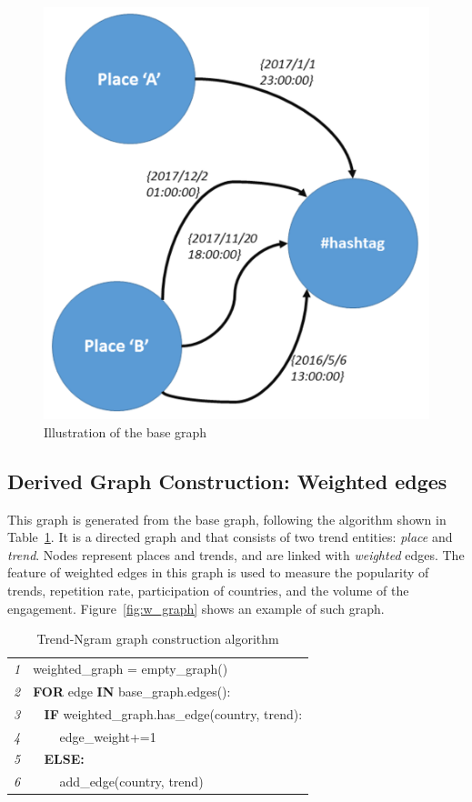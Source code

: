 \documentclass[conference]{IEEEtran}
\begin{document}
\begin{figure}[htb] \centering
\includegraphics[width=\columnwidth]{images/base_graph.png}
\caption{Illustration of the base graph}
\label{fig:basegraph}
\end{figure}


\subsection{Derived Graph Construction: Weighted edges}

This graph is generated from the base graph, following the algorithm 
shown in Table~\ref{tbl:algorithm1}. It is a directed graph and that consists of two trend entities:
{\emph{place}} and {\emph{trend}}. Nodes represent places and
trends, and are linked with {\emph{weighted}} edges. The feature 
of weighted edges in this graph is used to measure the popularity 
of trends, repetition rate, participation of countries, and the volume 
of the engagement. Figure~\ref{fig:w_graph} shows an example 
of such graph.


\begin{table}
\centering
\begin{tabular}{l|l}
\hline
{\emph{1}} & weighted\_graph = empty\_graph()\\
{\emph{2}} & \textbf{FOR} edge \textbf{IN} base\_graph.edges():\\
{\emph{3}} &  $\>\>\>\>$\textbf{IF} weighted\_graph.has\_edge(country, trend):\\
{\emph{4}} &  $\>\>\>\>\>\>\>\>$ edge\_weight+=1\\
{\emph{5}} &  $\>\>\>\>$\textbf{ELSE:}\\
{\emph{6}} &  $\>\>\>\>\>\>\>\>$ add\_edge(country, trend)\\
\hline
\end{tabular}
\caption{Trend-Ngram graph construction algorithm}
\label{tbl:algorithm1}
\end{table}
\end{document}
